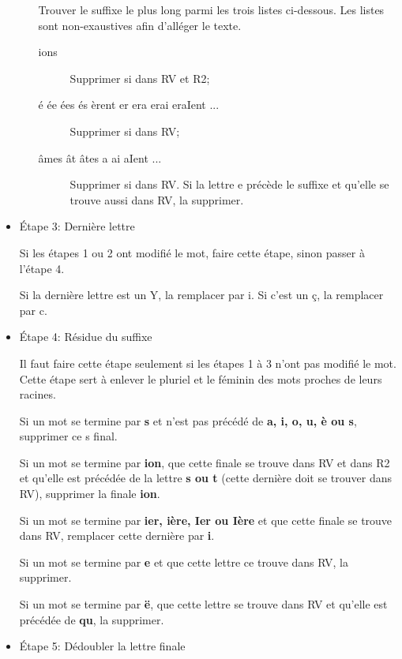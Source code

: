 \begin{itemize}
\begin{itemize}
Trouver le suffixe le plus long parmi les trois listes ci-dessous.
Les listes sont non-exaustives afin d'alléger le texte.

\begin{description}
  \item[ions]
  
  Supprimer si dans RV et R2;
  
  \item[é ée ées és èrent er era erai eraIent ...]
  
  Supprimer si dans RV;
  
  \item[âmes ât âtes a ai aIent ...]
  
  Supprimer si dans RV. Si la lettre e précède le suffixe et qu'elle se trouve aussi dans RV, la supprimer.
\end{description}


\end{itemize}

\item{Étape 3: Dernière lettre}

Si les étapes 1 ou 2 ont modifié le mot, faire cette étape, sinon passer à l'étape 4.

Si la dernière lettre est un Y, la remplacer par i.
Si c'est un ç, la remplacer par c.

\item{Étape 4: Résidue du suffixe}

Il faut faire cette étape seulement si les étapes 1 à 3 n'ont pas modifié le mot.
Cette étape sert à enlever le pluriel et le féminin des mots proches de leurs racines.

Si un mot se termine par \textbf{s} et n'est pas précédé de \textbf{a, i, o, u, è ou s}, supprimer ce s final.

Si un mot se termine par \textbf{ion}, que cette finale se trouve dans RV et dans R2 et qu'elle est précédée de la lettre \textbf{s ou t} (cette dernière doit se trouver dans RV), supprimer la finale \textbf{ion}.

Si un mot se termine par \textbf{ier, ière, Ier ou Ière} et que cette finale se trouve dans RV, remplacer cette dernière par \textbf{i}.

Si un mot se termine par \textbf{e} et que cette lettre ce trouve dans RV, la supprimer.

Si un mot se termine par \textbf{ë}, que cette lettre se trouve dans RV et qu'elle est précédée de \textbf{qu}, la supprimer.

\item{Étape 5: Dédoubler la lettre finale}


\end{itemize}
